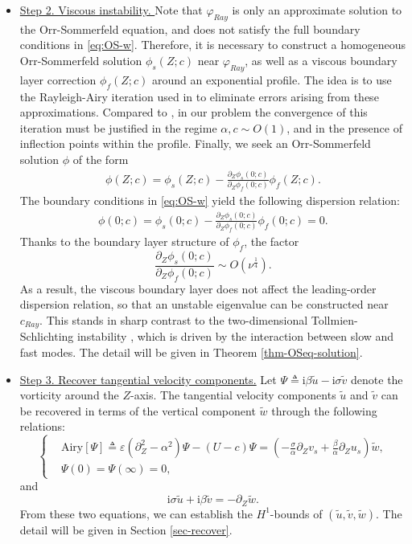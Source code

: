 \documentclass[reqno,11pt]{amsart}
\numberwithin{equation}{section}
\numberwithin{equation}{section}
\theoremstyle{plain}
\begin{document}
\begin{itemize}
	
\item \underline{Step 2. Viscous instability. } Note that $\varphi_{Ray}$ is only an approximate solution to the Orr-Sommerfeld equation, and does not satisfy the full boundary conditions in \eqref{eq:OS-w}. Therefore, it is necessary to construct a homogeneous Orr-Sommerfeld solution $\phi_s(Z;c)$ near $\varphi_{Ray}$, as well as a viscous boundary layer correction $\phi_f(Z;c)$ around an exponential profile. The idea is to use the Rayleigh-Airy iteration used in \cite{GGN-DMJ,GMM-duke} to eliminate errors arising from these approximations. Compared to \cite{GGN-DMJ,GMM-duke}, in our problem the convergence of this iteration must be justified in the regime $\alpha,c\sim O(1)$, and in the presence of inflection points within the profile. Finally, we seek an Orr-Sommerfeld solution $\phi$ of the form 
\begin{align}
	\phi(Z;c)=\phi_{s}(Z;c)-\frac{\partial_Z\phi_s(0;c)}{\partial_Z\phi_f(0;c)}\phi_f(Z;c).\nonumber
\end{align}
The boundary conditions in \eqref{eq:OS-w} yield the following dispersion relation:
\begin{align}
	\phi(0;c)=\phi_s(0;c)-\frac{\partial_Z\phi_s(0;c)}{\partial_Z\phi_f(0;c)}\phi_f(0;c)=0.\nonumber
\end{align}
Thanks to the boundary layer structure of $\phi_f$, the factor
$$\frac{\partial_Z\phi_s(0;c)}{\partial_Z\phi_f(0;c)}\sim O(\nu^{\frac14}).
$$	
As a result, the viscous boundary layer does not affect the leading-order dispersion relation, so that an unstable eigenvalue can be constructed near $c_{Ray}$. This stands in sharp contrast to the two-dimensional Tollmien-Schlichting instability \cite{GGN-DMJ}, which is driven by the interaction between slow and fast modes. The detail will be given in Theorem \ref{thm-OSeq-solution}. \\

\item \underline{Step 3. Recover tangential velocity components.} Let $\Psi\triangleq \mathrm{i}\beta \tilde{u}-\mathrm{i}\sigma \tilde{v}$ denote the vorticity around the $Z$-axis. The tangential velocity components  $\tilde{u}$ and $\tilde{v}$ can be recovered in terms of the vertical component $\tilde{w}$ through the following relations:
\begin{equation}\label{eq:Airy-vorticity}
	\left\{
	\begin{aligned}
		&\mathrm{Airy}[\Psi]\triangleq\varepsilon(\partial_Z^2-\alpha^2)\Psi-(U-c)\Psi=(-\frac{\sigma}{\alpha}\partial_Zv_s+\frac{\beta}{\alpha}\partial_Z u_s)\tilde{w},\\
		&\Psi(0)=\Psi(\infty)=0,
	\end{aligned}
	\right.
\end{equation}
and
\begin{equation}
	\mathrm{i}\sigma\tilde{u}+\mathrm{i}\beta\tilde{v}=-\partial_Z\tilde{w}.\nonumber
\end{equation}
From these two equations, we can establish the $H^1$-bounds of $(\tilde{u},\tilde{v},\tilde{w})$. The detail will be given in Section \ref{sec-recover}.


\end{itemize}
\end{document}
